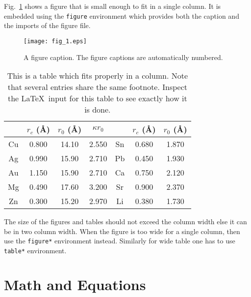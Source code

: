 \documentclass[twocolumn,amsmath,amssymb]{snp}
\begin{document}
Fig.~\ref{fig1} shows a figure that is small enough to
fit in a single column. It is embedded using the \texttt{figure}
environment which provides both the caption and the imports of the figure
file.
\begin{figure}
\texttt{[image: fig\_1.eps]}%
\caption{\label{fig1} A figure caption. The figure captions are
automatically numbered.}
\end{figure}

\begin{table}[h]
\caption{\label{tab:table1}This is a table which fits
properly in a column. Note that several entries share the same
footnote. Inspect the \LaTeX\ input for this table to see
exactly how it is done.}
\begin{tabular}{|c|c|c|c|c|c|c|}
\hline 
&$r_c$ (\AA)& $r_0$ (\AA)& $\kappa r_0$&
 &$r_c$ (\AA) &$r_0$ (\AA)\\ \hline
Cu& 0.800 & 14.10 & 2.550 &Sn\footnotemark[1]
& 0.680 & 1.870 \\
Ag& 0.990 & 15.90 & 2.710 &Pb\footnotemark[2]
& 0.450 & 1.930  \\
Au& 1.150 & 15.90 & 2.710 &Ca\footnotemark[3]
& 0.750 & 2.120 \\
Mg& 0.490 & 17.60 & 3.200 &Sr\footnotemark[4]
& 0.900 & 2.370 \\
Zn& 0.300 & 15.20 & 2.970 &Li\footnotemark[2]
& 0.380 & 1.730 \\
\hline
\end{tabular}
\end{table}



The size of the figures and tables should not exceed the column width else it can be in two column width. When the figure is too wide for a single column, then use the \texttt{figure*} environment instead. Similarly for wide table one has to use 
\texttt{table*} environment.



\section{Math and Equations}
\end{document}
